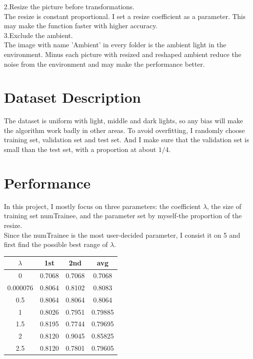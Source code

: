\documentclass[sigconf]{acmart}
\begin{document}
    2.Resize the picture before transformations.\\
    
    The resize is constant proportional. I set a resize coefficient as a parameter. This may make the function faster with higher accuracy.\\
    
    3.Exclude the ambient.\\
    
    The image with name 'Ambient' in every folder is the ambient light in the environment. Minus each picture with resized and reshaped ambient reduce the noise from the environment and may make the performance better.\\
    
\section{Dataset Description}

The dataset is uniform with light, middle and dark lights, so any bias will make the algorithm work badly in other areas. To avoid overfitting, I randomly choose training set, validation set and test set. And I make sure that the validation set is small than the test set, with a proportion at about $1/4$.\\

\section{Performance}

In this project, I mostly focus on three parameters: the coefficient $\lambda$, the size of training set numTrainee, and the parameter set by myself-the proportion of the resize.\\

Since the numTrainee is the most user-decided parameter, I consist it on 5 and first find the possible best range of $\lambda$.

\begin{center}
	\begin{tabular}{cccc}
	\hline
	$\lambda$& 1st& 2nd& avg\\
	\hline
	0& 0.7068& 0.7068& 0.7068\\
	0.000076& 0.8064& 0.8102& 0.8083\\
	0.5& 0.8064& 0.8064& 0.8064\\
	1& 0.8026& 0.7951& 0.79885\\
	1.5& 0.8195& 0.7744& 0.79695\\
	2& 0.8120& 0.9045& 0.85825\\
	2.5& 0.8120& 0.7801& 0.79605\\
	\hline
	\end{tabular}
\end{center}
\end{document}
